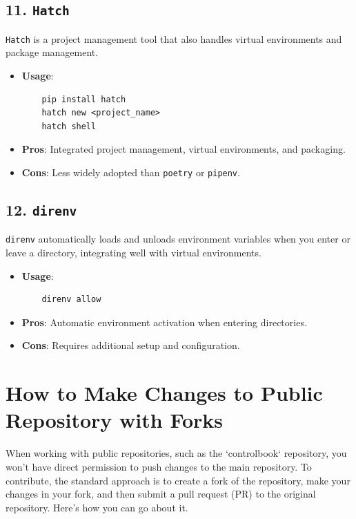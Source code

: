\documentclass{article}
\begin{document}
\subsection{11. \texttt{Hatch}}
\texttt{Hatch} is a project management tool that also handles virtual environments and package management.

\begin{itemize}
    \item \textbf{Usage}: 
    \begin{verbatim}
    pip install hatch
    hatch new <project_name>
    hatch shell
    \end{verbatim}
    \item \textbf{Pros}: Integrated project management, virtual environments, and packaging.
    \item \textbf{Cons}: Less widely adopted than \texttt{poetry} or \texttt{pipenv}.
\end{itemize}

\subsection{12. \texttt{direnv}}
\texttt{direnv} automatically loads and unloads environment variables when you enter or leave a directory, integrating well with virtual environments.

\begin{itemize}
    \item \textbf{Usage}: 
    \begin{verbatim}
    direnv allow
    \end{verbatim}
    \item \textbf{Pros}: Automatic environment activation when entering directories.
    \item \textbf{Cons}: Requires additional setup and configuration.
\end{itemize}
\newpage

\section{How to Make Changes to Public Repository with Forks}
\label{appendix-b}
When working with public repositories, such as the `controlbook` repository, you won't have direct permission to push changes to the main repository. To contribute, the standard approach is to create a fork of the repository, make your changes in your fork, and then submit a pull request (PR) to the original repository. Here's how you can go about it.
\end{document}
